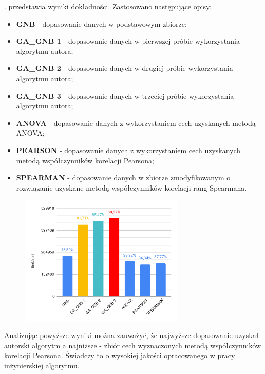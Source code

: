 . przedstawia wyniki dokładności. Zastosowano następujące opisy:
\begin{itemize}
    \item \textbf{GNB} - dopasowanie danych w podstawowym zbiorze;
    \item \textbf{GA\_GNB 1} - dopasowanie danych w pierwszej próbie wykorzystania algorytmu autora;
    \item \textbf{GA\_GNB 2} - dopasowanie danych w drugiej próbie wykorzystania algorytmu autora;
    \item \textbf{GA\_GNB 3} - dopasowanie danych w trzeciej próbie wykorzystania algorytmu autora;
    \item \textbf{ANOVA} - dopasowanie danych z wykorzystaniem cech uzyskanych metodą ANOVA;
    \item \textbf{PEARSON} - dopasowanie danych z wykorzystaniem cech uzyskanych metodą współczynników korelacji Pearsona;
    \item \textbf{SPEARMAN} - dopasowanie danych w zbiorze zmodyfikowanym o rozwiązanie uzyskane metodą  współczynników korelacji rang Spearmana.
\end{itemize}


\begin{figure}[H]
    \centering
    \includegraphics[width=0.7\textwidth]{images/Monday-WorkingHours_cmp}
    \label{fig:mond}
\end{figure}

Analizując powyższe wyniki można zauważyć, że najwyższe dopasowanie uzyskał autorski algorytm a najniższe - zbiór cech wyznaczonych metodą współczynników korelacji Pearsona. Świadczy to o wysokiej jakości opracowanego w pracy inżynierskiej algorytmu.

